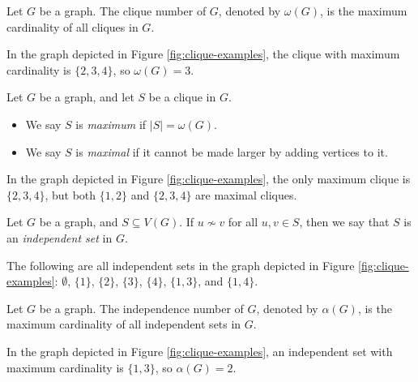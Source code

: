 \begin{defn}
    Let $G$ be a graph. The clique number of $G$, denoted by $\omega(G)$, is the maximum cardinality of all cliques in $G$.
\end{defn}

\begin{exmp}
    In the graph depicted in Figure \ref{fig:clique-examples}, the clique with maximum cardinality is $\{2, 3, 4\}$, so $\omega(G) = 3$.
\end{exmp}

\begin{defn}
    Let $G$ be a graph, and let $S$ be a clique in $G$.
    \begin{itemize}
        \item We say $S$ is \emph{maximum} if $|S| = \omega(G)$.
        \item We say $S$ is \emph{maximal} if it cannot be made larger by adding vertices to it.
    \end{itemize}
\end{defn}

\begin{exmp}
    In the graph depicted in Figure \ref{fig:clique-examples}, the only maximum clique is $\{2, 3, 4\}$, but both $\{1, 2\}$ and $\{2, 3, 4\}$ are maximal cliques.
\end{exmp}

\begin{defn}
    Let $G$ be a graph, and $S \subseteq V(G)$. If $u \not\sim v$ for all $u, v \in S$, then we say that $S$ is an \emph{independent set} in $G$.
\end{defn}

\begin{exmp}
    The following are all independent sets in the graph depicted in Figure \ref{fig:clique-examples}: $\emptyset$, $\{1\}$, $\{2\}$, $\{3\}$, $\{4\}$, $\{1, 3\}$, and $\{1, 4\}$.
\end{exmp}

\begin{defn}
    Let $G$ be a graph. The independence number of $G$, denoted by $\alpha(G)$, is the maximum cardinality of all independent sets in $G$.
\end{defn}

\begin{exmp}
    In the graph depicted in Figure \ref{fig:clique-examples}, an independent set with maximum cardinality is $\{1, 3\}$, so $\alpha(G) = 2$.
\end{exmp}

